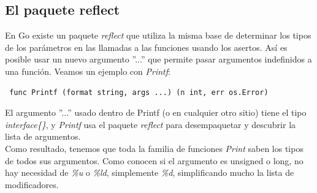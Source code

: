 	\subsection{El paquete reflect}
	
	En Go existe un paquete \textit{reflect} que utiliza la misma base de
	determinar los tipos de los parámetros en las llamadas a las funciones
	usando los asertos. Así es posible usar un nuevo argumento ''...'' que
	permite pasar argumentos indefinidos a una función. Veamos un ejemplo con
	\textit{Printf}:
	
	\begin{verbatim} func Printf (format string, args ...) (n int, err os.Error)
	\end{verbatim}
	
	El argumento ''...'' usado dentro de Printf (o en cualquier otro sitio)
	tiene el tipo \textit{interface\{\}}, y \textit{Printf} usa el paquete
	\textit{reflect} para desempaquetar y descubrir la lista de argumentos.\\
	
	Como resultado, tenemos que toda la familia de funciones \textit{Print}
	saben los tipos de todos sus argumentos. Como conocen si el argumento es
	unsigned o long, no hay necesidad de \textit{\%u} o \textit{\%ld},
	simplemente \textit{\%d}, simplificando mucho la lista de modificadores.
	

